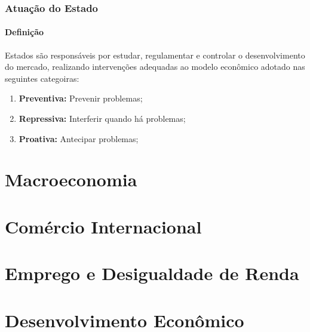 \documentclass{article}
\begin{document}
        \subsubsection{Atuação do Estado}
            \paragraph{Definição}Estados são responsáveis por estudar, regulamentar e controlar o desenvolvimento do mercado, realizando intervenções adequadas ao modelo econômico adotado nas seguintes categoiras:
                \begin{enumerate}
                    \item \textbf{Preventiva:} Prevenir problemas;
                    \item \textbf{Repressiva:} Interferir quando há problemas;
                    \item \textbf{Proativa:} Antecipar problemas;
                \end{enumerate}

    \section{Macroeconomia}

    \section{Comércio Internacional}

    \section{Emprego e Desigualdade de Renda}

    \section{Desenvolvimento Econômico}
\end{document}
